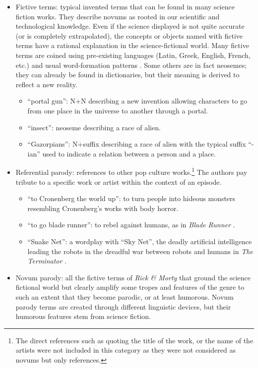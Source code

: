 \documentclass[output=paper]{langscibook}
\begin{document}
\begin{itemize}
\item Fictive terms: typical invented terms that can be found in many science fiction works. They describe novums as rooted in our scientific and technological knowledge. Even if the science displayed is not quite accurate (or is completely extrapolated), the concepts or objects named with fictive terms have a rational explanation in the science-fictional world. Many fictive terms are coined using pre-existing languages (Latin, Greek, English, French, etc.) and usual word-formation patterns \citep{Gindre1999}. Some others are in fact neosemes; they can already be found in dictionaries, but their meaning is derived to reflect a new reality.

\begin{itemize}
\item “portal gun”: N+N describing a new invention allowing characters to go from one place in the universe to another through a portal.
\item “insect”: neoseme describing a race of alien.
\item “Gazorpians”: N+suffix describing a race of alien with the typical suffix “-ian” used to indicate a relation between a person and a place.
\end{itemize}
\item Referential parody: references to other pop culture works.\footnote{The direct references such as quoting the title of the work, or the name of the artists were not included in this category as they were not considered as novums but only references.}  The authors pay tribute to a specific work or artist within the context of an episode.

\begin{itemize}
\item  “to Cronenberg the world up”: to turn people into hideous monsters resembling Cronenberg’s works with body horror.
\item “to go blade runner”: to rebel against humans, as in \textit{Blade Runner} \citep{Scott1982}.
\item “Snake Net”: a wordplay with “Sky Net”, the deadly artificial intelligence leading the robots in the dreadful war between robots and humans in \textit{The Terminator} \citep{Cameron1984}.
\end{itemize}
\item Novum parody: all the fictive terms of \textit{Rick \& Morty} that ground the science fictional world but clearly amplify some tropes and features of the genre to such an extent that they become parodic, or at least humorous. Novum parody terms are created through different linguistic devices, but their humorous features stem from science fiction.


\end{itemize}
\end{document}
